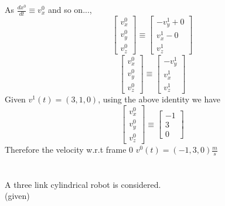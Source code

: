 \documentclass[12pt]{article}
\newcommand{\given}{{\\ \color{blue} \hspace*{\fill}(given)} \\}
\begin{document}
As $\frac{dx^0}{dt} \equiv v_x^0$ and so on...,
\[
  \begin{bmatrix} v_x^0 \\ v_y^0 \\ v_z^0\end{bmatrix} \equiv
  \begin{bmatrix} -v_y^1 + 0 \\ v_x^1 - 0 \\ v_z^1\end{bmatrix}
\]
\[
  \begin{bmatrix} v_x^0 \\ v_y^0 \\ v_z^0\end{bmatrix} \equiv
  \begin{bmatrix} -v_y^1 \\ v_x^1 \\ v_z^1\end{bmatrix}
\]
Given $v^1(t) = (3, 1, 0)$, using the above identity we have
\[
  \begin{bmatrix} v_x^0 \\ v_y^0 \\ v_z^0\end{bmatrix} \equiv
  \begin{bmatrix} -1 \\ 3 \\ 0\end{bmatrix}
\]
Therefore the velocity w.r.t frame 0 $v^0(t) = (-1, 3, 0) \frac{m}{s}$

\pagebreak

\section{}
A three link cylindrical robot is considered.
\given
\end{document}
